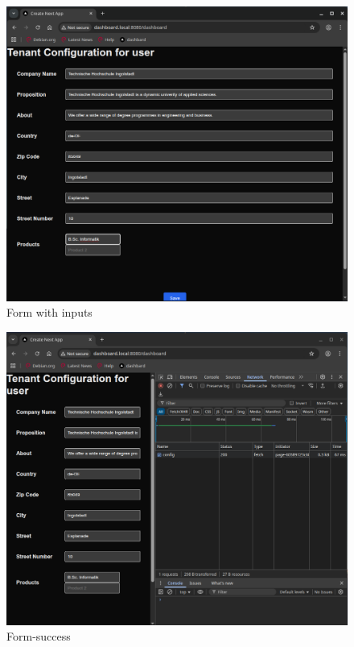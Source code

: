 \documentclass[11pt, a4paper, oneside, listof=totoc]{scrartcl}
\begin{document}
                \begin{figure}[h!]
                    \centering
                    \includegraphics[width=\textwidth]{screenshots/eval/dashboardfe/dashboardfe-form-with-inputs.png}
                    \caption{Form with inputs}\label{fig:dashboardfe-form-with-inputs}
                \end{figure}

                \begin{figure}[h!]
                    \centering
                    \includegraphics[width=\textwidth]{screenshots/eval/dashboardfe/dashboardfe-form-200.png}
                    \caption{Form-success}\label{fig:dashboardfe-form-200}
                \end{figure}
\end{document}
